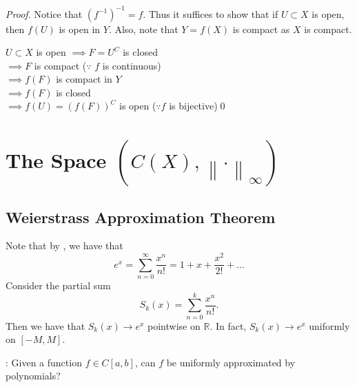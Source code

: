 \documentclass[notoc,notitlepage]{tufte-book}
\newcommand{\norm}[1]{\left\| #1 \right\|}
\begin{document}
\begin{proof}
  Notice that $(f^{-1})^{-1} = f$. Thus it suffices to show that if $U \subset X$ is open, then $f(U)$ is open in $Y$. Also, note that $Y = f(X)$ is compact as $X$ is compact.

  \noindent
  $U \subset X$ is open $\implies F = U^C$ is closed \\
  $\implies F$ is compact ($\because$ $f$ is continuous) \\
  $\implies f(F)$ is compact in $Y$ \\
  $\implies f(F)$ is closed \\
  $\implies f(U) = (f(F))^C$ is open ($\because f$ is bijective)\qed\
\end{proof}


\section{The Space $(C(X), \norm\cdot_\infty)$}%
\label{sec:the_space_c_x_normcdot_infty_}

\subsection{Weierstrass Approximation Theorem}%
\label{sub:weierstrass_approximation_theorem}

\begin{eg}
  Note that by , we have that
  \begin{equation*}
    e^x = \sum_{n=0}^{\infty} \frac{x^n}{n!} = 1 + x + \frac{x^2}{2!} + \hdots
  \end{equation*}
  Consider the partial sum
  \begin{equation*}
    S_k(x) = \sum_{n=0}^{k} \frac{x^n}{n!}.
  \end{equation*}
  Then we have that $S_k(x) \to e^x$ pointwise on $\mathbb{R}$. In fact, $S_k(x) \to e^x$ uniformly on $[-M, M]$.
\end{eg}

: Given a function $f \in C[a, b]$, can $f$ be uniformly approximated by polynomials?
\end{document}
